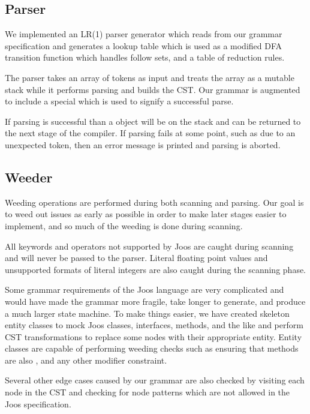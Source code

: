 \documentclass[pdftex,11pt,a4paper]{article}
\begin{document}
\subsection{Parser}

We implemented an LR(1) parser generator which reads from our grammar
specification and generates a lookup table which is used as a modified
DFA transition function which handles follow sets, and a table of
reduction rules.

The parser takes an array of tokens as input and treats the array as a
mutable stack while it performs parsing and builds the CST. Our
grammar is augmented to include a special  which is
used to signify a successful parse.

If parsing is successful than a 
object will be on the stack and can be returned to the next stage of
the compiler. If parsing fails at some point, such as due to an
unexpected token, then an error message is printed and parsing is
aborted.


\subsection{Weeder}

Weeding operations are performed during both scanning and parsing. Our
goal is to weed out issues as early as possible in order to make later
stages easier to implement, and so much of the weeding is done during
scanning.

All keywords and operators not supported by Joos are caught during
scanning and will never be passed to the parser. Literal floating
point values and unsupported formats of literal integers are also
caught during the scanning phase.

Some grammar requirements of the Joos language are very complicated
and would have made the grammar more fragile, take longer to generate,
and produce a much larger state machine. To make things easier, we
have created skeleton entity classes to mock Joos classes, interfaces,
methods, and the like and perform CST transformations to replace some
nodes with their appropriate entity. Entity classes are capable of
performing weeding checks such as ensuring that  methods
are also , and any other modifier constraint.

Several other edge cases caused by our grammar are also checked by
visiting each node in the CST and checking for node patterns which are
not allowed in the Joos specification.
\end{document}
